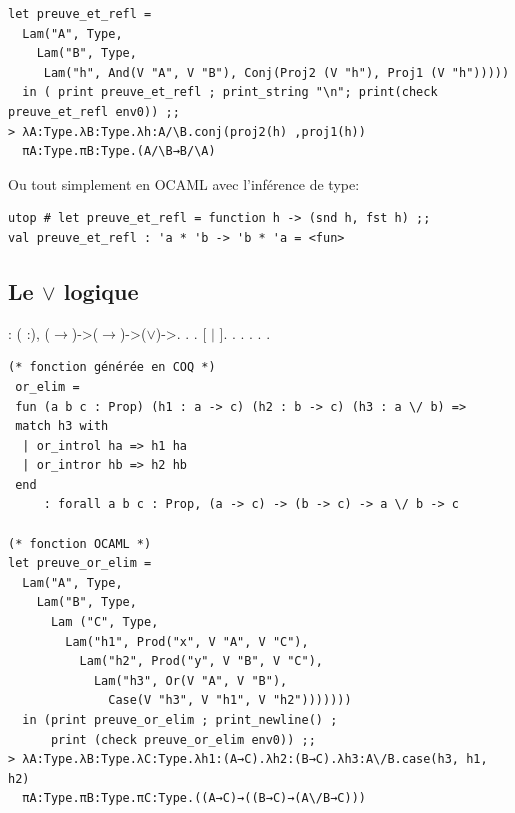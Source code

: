 \documentclass[11pt]{book}
\begin{document}
\begin{Verbatim}
let preuve_et_refl = 
  Lam("A", Type,
    Lam("B", Type, 
     Lam("h", And(V "A", V "B"), Conj(Proj2 (V "h"), Proj1 (V "h"))))) 
  in ( print preuve_et_refl ; print_string "\n"; print(check preuve_et_refl env0)) ;;
> λA:Type.λB:Type.λh:A/\B.conj(proj2(h) ,proj1(h))
  πA:Type.πB:Type.(A/\B→B/\A)
\end{Verbatim}
Ou tout simplement en OCAML avec l'inférence de type:
\begin{Verbatim}
utop # let preuve_et_refl = function h -> (snd h, fst h) ;;
val preuve_et_refl : 'a * 'b -> 'b * 'a = <fun>
\end{Verbatim}

\subsection{Le $\lor$ logique}

\begin{coqdoccode}
\coqdocnoindent
{} : \coqdockw{\ensuremath{\forall}} (  :), (\ensuremath{\rightarrow})->(\ensuremath{\rightarrow})->(\ensuremath{\lor})->.\coqdoceol
\coqdocnoindent
{}.\coqdoceol
\coqdocindent{1.00em}
      .\coqdoceol
\coqdocindent{1.00em}
   [ \ensuremath{|} ].\coqdoceol
\coqdocindent{1.00em}
 .  .\coqdoceol
\coqdocindent{1.00em}
 .  .\coqdoceol
\coqdocnoindent
{}.\coqdoceol
\end{coqdoccode}
\begin{Verbatim}
(* fonction générée en COQ *)
 or_elim = 
 fun (a b c : Prop) (h1 : a -> c) (h2 : b -> c) (h3 : a \/ b) =>
 match h3 with
  | or_introl ha => h1 ha
  | or_intror hb => h2 hb
 end
     : forall a b c : Prop, (a -> c) -> (b -> c) -> a \/ b -> c  

(* fonction OCAML *)
let preuve_or_elim =
  Lam("A", Type,
    Lam("B", Type,
      Lam ("C", Type,
        Lam("h1", Prod("x", V "A", V "C"),
          Lam("h2", Prod("y", V "B", V "C"),
            Lam("h3", Or(V "A", V "B"), 
              Case(V "h3", V "h1", V "h2"))))))) 
  in (print preuve_or_elim ; print_newline() ;
      print (check preuve_or_elim env0)) ;;
> λA:Type.λB:Type.λC:Type.λh1:(A→C).λh2:(B→C).λh3:A\/B.case(h3, h1, h2)
  πA:Type.πB:Type.πC:Type.((A→C)→((B→C)→(A\/B→C)))
\end{Verbatim}
\end{document}
